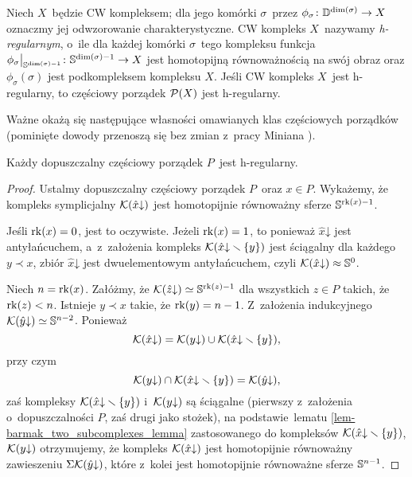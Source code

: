 \begin{ex}
Niech $X$~będzie CW kompleksem; dla jego komórki $\sigma$~przez $\phi_\sigma\colon \D^{\dim(\sigma)}\to X$ oznaczmy jej odwzorowanie charakterystyczne. CW kompleks $X$~nazywamy \textit{h-regularnym}, o~ile dla każdej komórki $\sigma$~tego kompleksu funkcja $\phi_\sigma\big|_{\S^{\dim(\sigma)-1}}\colon \S^{\dim(\sigma)-1}\to X$ jest homotopijną równoważnością na swój obraz oraz $\phi_\sigma(\sigma)$ jest podkompleksem kompleksu $X$. Jeśli CW kompleks $X$~jest h-regularny, to częściowy porządek $\mP(X)$ jest h-regularny.
\end{ex}

Ważne okażą się następujące własności omawianych klas częściowych porządków (pominięte dowody przenoszą się bez zmian z~pracy Miniana \cite{Minian12}).

\begin{stw}\label{stw-minianremark}
Każdy dopuszczalny częściowy porządek $P$~jest \mbox{h-regularny}.
\end{stw}
\begin{proof}
Ustalmy dopuszczalny częściowy porządek $P$~oraz $x\in P$. Wykażemy, że kompleks symplicjalny $\mK(\hat{x}\mathord{\downarrow})$ jest homotopijnie równoważny sferze $\S^{\Ht(x)-1}$.

Jeśli $\Ht(x)=0$, jest to oczywiste. Jeżeli $\Ht(x)=1$, to ponieważ $\hat{x}\mathord{\downarrow}$ jest antyłańcuchem, a~z~założenia kompleks \mbox{$\mK(\hat{x}\mathord{\downarrow}\smallsetminus \{y\})$} jest ściągalny dla każdego $y\prec x$, zbiór $\hat{x}\mathord{\downarrow}$ jest dwuelementowym antyłańcuchem, czyli $\mK(\hat{x}\mathord{\downarrow})\approx \S^0$.

Niech $n=\rk(x)$. Załóżmy, że $\mK(\hat{z}\mathord{\downarrow})\simeq \S^{\Ht(z)-1}$ dla wszystkich $z\in P$ takich, że $\Ht(z)< n$. Istnieje $y\prec x$ takie, że $\Ht(y)=n-1$. Z~założenia indukcyjnego $\mK(\hat{y}\mathord{\downarrow})\simeq \S^{n-2}$. Ponieważ \[\mK(\hat{x}\mathord{\downarrow})=\mK(y\mathord{\downarrow})\cup \mK(\hat{x}\mathord{\downarrow}\smallsetminus \{y\}),\] przy czym \[\mK(y\mathord{\downarrow})\cap \mK(\hat{x}\mathord{\downarrow}\smallsetminus \{y\})=\mK(\hat{y}\mathord{\downarrow}),\] zaś kompleksy $\mK(\hat{x}\mathord{\downarrow}\smallsetminus \{y\})$ i~$\mK(y\mathord{\downarrow})$ są ściągalne (pierwszy z~założenia o~dopuszczalności $P$, zaś drugi jako stożek), na podstawie~lematu \ref{lem-barmak_two_subcomplexes_lemma} zastosowanego do kompleksów $\mK(\hat{x}\mathord{\downarrow}\smallsetminus\{y\})$, $\mK(y\mathord{\downarrow})$ otrzymujemy, że kompleks $\mK(\hat{x}\mathord{\downarrow})$ jest homotopijnie równoważny zawieszeniu $\Sigma \mK(\hat{y}\mathord{\downarrow})$, które z~kolei jest homotopijnie równoważne sferze $\S^{n-1}$.
\end{proof}

